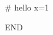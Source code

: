 \documentclass[11pt,a4paper,oneside]{book}
\begin{document}
\begin{code}
# hello
x=1
\end{code}
END
\end{document}
